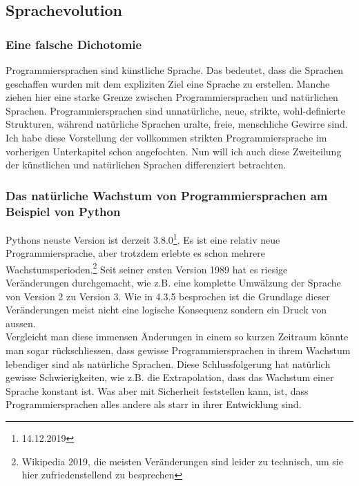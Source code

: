 \documentclass[10pt,a4paper]{article}
\begin{document}
\subsection{Sprachevolution}

\subsubsection{Eine falsche Dichotomie}
Programmiersprachen sind künstliche Sprache. Das bedeutet, dass die Sprachen geschaffen wurden mit dem expliziten Ziel eine Sprache zu erstellen. Manche ziehen hier eine starke Grenze zwischen Programmiersprachen und natürlichen Sprachen. Programmiersprachen sind unnatürliche, neue, strikte, wohl-definierte Strukturen, während natürliche Sprachen uralte, freie, menschliche Gewirre sind.
Ich habe diese Vorstellung der vollkommen strikten Programmiersprache im vorherigen Unterkapitel schon angefochten. Nun will ich auch diese Zweiteilung der künstlichen und natürlichen Sprachen differenziert betrachten.

\subsubsection{Das natürliche Wachstum von Programmiersprachen am Beispiel von Python}
Pythons neuste Version ist derzeit 3.8.0\footnote{14.12.2019}. Es ist eine relativ neue Programmiersprache, aber trotzdem erlebte es schon mehrere Wachstumsperioden.\footnote{Wikipedia 2019, die meisten Veränderungen sind leider zu technisch, um sie hier zufriedenstellend zu besprechen} Seit seiner ersten Version 1989 hat es riesige Veränderungen durchgemacht, wie z.B. eine komplette Umwälzung der Sprache von Version 2 zu Version 3. Wie in 4.3.5 besprochen ist die Grundlage dieser Veränderungen meist nicht eine logische Konsequenz sondern ein Druck von aussen. \\
Vergleicht man diese immensen Änderungen in einem so kurzen Zeitraum könnte man sogar rückschliessen, dass gewisse Programmiersprachen in ihrem Wachstum lebendiger sind als natürliche Sprachen. Diese Schlussfolgerung hat natürlich gewisse Schwierigkeiten, wie z.B. die Extrapolation, dass das Wachstum einer Sprache konstant ist. Was aber mit Sicherheit feststellen kann, ist, dass Programmiersprachen alles andere als starr in ihrer Entwicklung sind.
\end{document}
